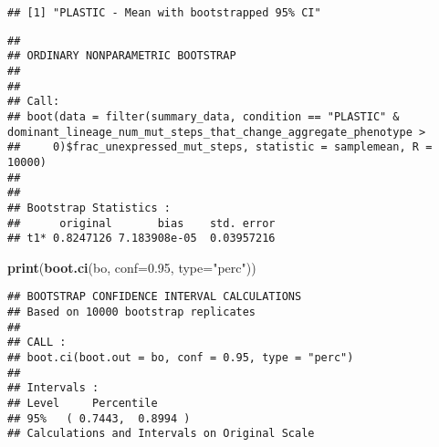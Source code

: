 \documentclass[]{book}
\newenvironment{Shaded}{\begin{snugshade}}{\end{snugshade}}
\newcommand{\DataTypeTok}[1]{\textcolor[rgb]{0.13,0.29,0.53}{#1}}
\newcommand{\DecValTok}[1]{\textcolor[rgb]{0.00,0.00,0.81}{#1}}
\newcommand{\FloatTok}[1]{\textcolor[rgb]{0.00,0.00,0.81}{#1}}
\newcommand{\KeywordTok}[1]{\textcolor[rgb]{0.13,0.29,0.53}{\textbf{#1}}}
\newcommand{\NormalTok}[1]{#1}
\newcommand{\OperatorTok}[1]{\textcolor[rgb]{0.81,0.36,0.00}{\textbf{#1}}}
\newcommand{\StringTok}[1]{\textcolor[rgb]{0.31,0.60,0.02}{#1}}
\begin{document}
\begin{verbatim}
## [1] "PLASTIC - Mean with bootstrapped 95% CI"
\end{verbatim}

\begin{Shaded}
\end{Shaded}

\begin{verbatim}
## 
## ORDINARY NONPARAMETRIC BOOTSTRAP
## 
## 
## Call:
## boot(data = filter(summary_data, condition == "PLASTIC" & dominant_lineage_num_mut_steps_that_change_aggregate_phenotype > 
##     0)$frac_unexpressed_mut_steps, statistic = samplemean, R = 10000)
## 
## 
## Bootstrap Statistics :
##      original       bias    std. error
## t1* 0.8247126 7.183908e-05  0.03957216
\end{verbatim}

\begin{Shaded}
\begin{Highlighting}[]
\KeywordTok{print}\NormalTok{(}\KeywordTok{boot.ci}\NormalTok{(bo, }\DataTypeTok{conf=}\FloatTok{0.95}\NormalTok{, }\DataTypeTok{type=}\StringTok{"perc"}\NormalTok{))}
\end{Highlighting}
\end{Shaded}

\begin{verbatim}
## BOOTSTRAP CONFIDENCE INTERVAL CALCULATIONS
## Based on 10000 bootstrap replicates
## 
## CALL : 
## boot.ci(boot.out = bo, conf = 0.95, type = "perc")
## 
## Intervals : 
## Level     Percentile     
## 95%   ( 0.7443,  0.8994 )  
## Calculations and Intervals on Original Scale
\end{verbatim}

\begin{Shaded}
\end{Shaded}
\end{document}
